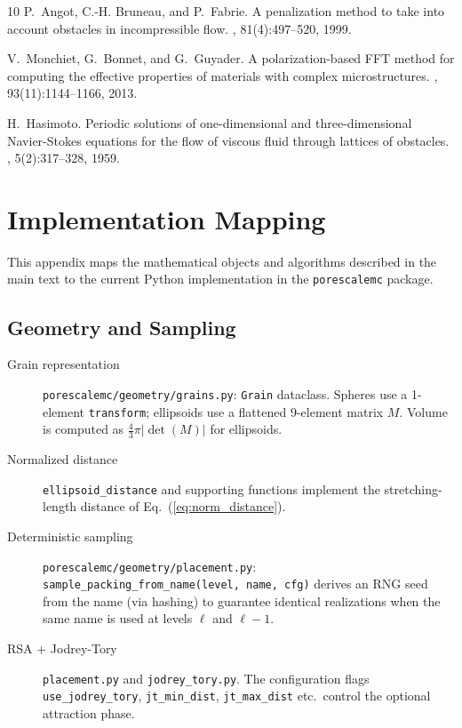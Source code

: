 \documentclass[preprint,12pt]{elsarticle}
\begin{document}
\begin{thebibliography}{10}
P.~Angot, C.-H. Bruneau, and P.~Fabrie.
\newblock A penalization method to take into account obstacles in incompressible flow.
, 81(4):497--520, 1999.

V.~Monchiet, G.~Bonnet, and G.~Guyader.
\newblock A polarization-based FFT method for computing the effective properties of materials with complex microstructures.
, 93(11):1144--1166, 2013.

H.~Hasimoto.
\newblock Periodic solutions of one-dimensional and three-dimensional Navier-Stokes equations for the flow of viscous fluid through lattices of obstacles.
, 5(2):317--328, 1959.

\end{thebibliography}

\appendix
\section{Implementation Mapping}
\label{app:implementation}

This appendix maps the mathematical objects and algorithms described in the main text to the current Python implementation in the \texttt{porescalemc} package.

\subsection{Geometry and Sampling}
\begin{description}
  \item[Grain representation] \texttt{porescalemc/geometry/grains.py}: \texttt{Grain} dataclass. Spheres use a 1-element \texttt{transform}; ellipsoids use a flattened 9-element matrix $M$. Volume is computed as $\frac{4}{3}\pi|\det(M)|$ for ellipsoids.
  \item[Normalized distance] \texttt{ellipsoid\_distance} and supporting functions implement the stretching-length distance of Eq.~(\ref{eq:norm_distance}).
  \item[Deterministic sampling] \texttt{porescalemc/geometry/placement.py}: \texttt{sample\_packing\_from\_name(level, name, cfg)} derives an RNG seed from the name (via hashing) to guarantee identical realizations when the same name is used at levels $\ell$ and $\ell-1$.
  \item[RSA + Jodrey-Tory] \texttt{placement.py} and \texttt{jodrey\_tory.py}. The configuration flags \texttt{use\_jodrey\_tory}, \texttt{jt\_min\_dist}, \texttt{jt\_max\_dist} etc.\ control the optional attraction phase.
\end{description}
\end{document}

